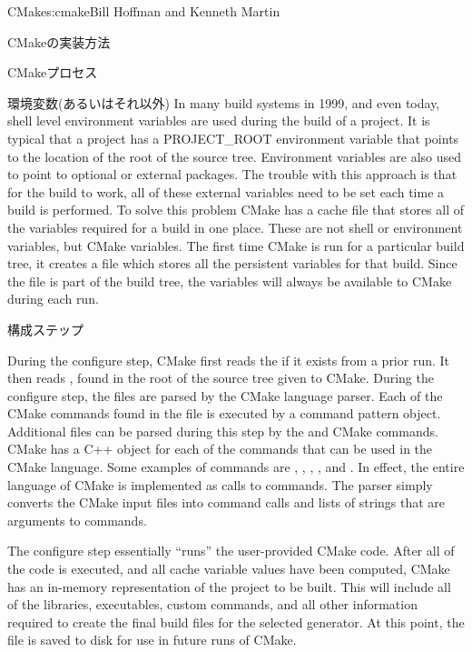 \begin{aosachapter}{CMake}{s:cmake}{Bill Hoffman and Kenneth Martin}
\begin{aosasect1}{CMakeの実装方法}
\begin{aosasect2}{CMakeプロセス}
\begin{aosasect3}{環境変数(あるいはそれ以外)}
In many build systems in 1999, and even today, shell level environment
variables are used during the build of a project. It is typical that a
project has a PROJECT\_ROOT environment variable that points to the
location of the root of the source tree.  Environment variables are
also used to point to optional or external packages. The trouble with
this approach is that for the build to work, all of these external
variables need to be set each time a build is performed. To solve this
problem CMake has a cache file that stores all of the variables
required for a build in one place. These are not shell or environment
variables, but CMake variables. The first time CMake is run for a
particular build tree, it creates a  file which
stores all the persistent variables for that build. Since the file is
part of the build tree, the variables will always be available to
CMake during each run.

\end{aosasect3}

\begin{aosasect3}{構成ステップ}

During the configure step, CMake first reads the 
if it exists from a prior run.  It then reads ,
found in the root of the source tree given to CMake. During the
configure step, the  files are parsed by the
CMake language parser. Each of the CMake commands found in the file is
executed by a command pattern object. Additional 
files can be parsed
during this step by the  and 
CMake commands.
CMake has a C++ object for each of the commands that can be used in
the CMake language. Some examples of commands are ,
, , , and
. In effect, the entire language of CMake is implemented
as calls to commands. The parser simply converts the CMake input files
into command calls and lists of strings that are arguments to
commands.

The configure step essentially ``runs'' the user-provided CMake
code. After all of the code is executed, and all cache variable values
have been computed, CMake has an in-memory representation of the
project to be built. This will include all of the libraries,
executables, custom commands, and all other information required to
create the final build files for the selected generator. At this
point, the  file is saved to disk for use in
future runs of CMake.


\end{aosasect3}
\end{aosasect2}
\end{aosasect1}
\end{aosachapter}

